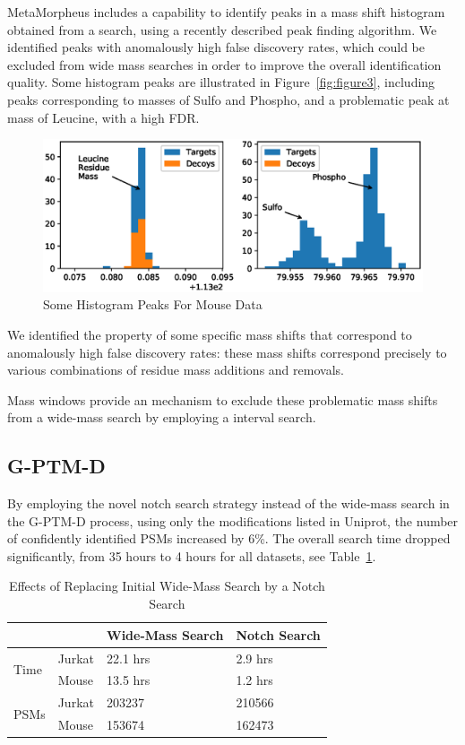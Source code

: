 \documentclass[journal=jprobs,manuscript=article]{achemso}
\begin{document}
MetaMorpheus includes a capability to identify peaks in a mass shift histogram obtained from a search, using a recently described peak finding algorithm\cite{Rodriguez_2014}.
We identified peaks with anomalously high false discovery rates, which could be excluded from wide mass searches in order to improve the overall identification quality.
Some histogram peaks are illustrated in Figure~\ref{fig:figure3}, including peaks corresponding to masses of Sulfo and Phospho, and a problematic peak at mass of Leucine, with a high FDR.

\begin{figure}
\caption{Some Histogram Peaks For Mouse Data}
\label{fig:fig5-HistogramsAround80and113}
\includegraphics{fig5-HistogramsAround80and113}
\end{figure}

We identified the property of some specific mass shifts that correspond to anomalously high false discovery rates: these mass shifts correspond precisely to various combinations of residue mass additions and removals.

Mass windows provide an mechanism to exclude these problematic mass shifts from a wide-mass search by employing a interval search.

\subsection{G-PTM-D}

By employing the novel notch search strategy instead of the wide-mass search in the G-PTM-D process, using only the modifications listed in Uniprot, the number of confidently identified PSMs increased by 6\%.
The overall search time dropped significantly, from 35 hours to 4 hours for all datasets, see Table~\ref{my-label}.

\begin{table}[]
\centering
\caption{Effects of Replacing Initial Wide-Mass Search by a Notch Search}
\label{my-label}
\begin{tabular}{ll|l|l}
                      &        & Wide-Mass Search & Notch Search\\
\hline
\multirow{2}{*}{Time} & Jurkat & 22.1 hrs         & 2.9 hrs    \\
                      & Mouse  & 13.5 hrs         & 1.2 hrs   \\
\hline
\multirow{2}{*}{PSMs} & Jurkat & 203237           & 210566    \\
                      & Mouse  & 153674           & 162473   
\end{tabular}
\end{table}
\end{document}
